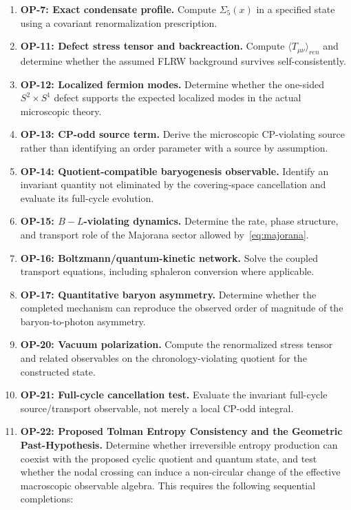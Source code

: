 \documentclass[11pt]{article}
\theoremstyle{canonmath}
\theoremstyle{canonpostulate}
\theoremstyle{canonclaim}
\def\mathrm#1{#1}%
\begin{document}
\begin{enumerate}
\item \textbf{OP-7: Exact condensate profile.} Compute $\Sigma_5(x)$ in a specified state using a covariant renormalization prescription.
\item \textbf{OP-11: Defect stress tensor and backreaction.} Compute $\langle T_{\mu\nu}\rangle_{\mathrm{ren}}$ and determine whether the assumed FLRW background survives self-consistently.
\item \textbf{OP-12: Localized fermion modes.} Determine whether the one-sided $S^2\times S^1$ defect supports the expected localized modes in the actual microscopic theory.
\item \textbf{OP-13: CP-odd source term.} Derive the microscopic CP-violating source rather than identifying an order parameter with a source by assumption.
\item \textbf{OP-14: Quotient-compatible baryogenesis observable.} Identify an invariant quantity not eliminated by the covering-space cancellation and evaluate its full-cycle evolution.
\item \textbf{OP-15: $B-L$-violating dynamics.} Determine the rate, phase structure, and transport role of the Majorana sector allowed by~\eqref{eq:majorana}.
\item \textbf{OP-16: Boltzmann/quantum-kinetic network.} Solve the coupled transport equations, including sphaleron conversion where applicable.
\item \textbf{OP-17: Quantitative baryon asymmetry.} Determine whether the completed mechanism can reproduce the observed order of magnitude of the baryon-to-photon asymmetry.
\item \textbf{OP-20: Vacuum polarization.} Compute the renormalized stress tensor and related observables on the chronology-violating quotient for the constructed state.
\item \textbf{OP-21: Full-cycle cancellation test.} Evaluate the invariant full-cycle source/transport observable, not merely a local CP-odd integral.
\item \textbf{OP-22: Proposed Tolman Entropy Consistency and the Geometric Past-Hypothesis.} Determine whether irreversible entropy production can coexist with the proposed cyclic quotient and quantum state, and test whether the nodal crossing can induce a non-circular change of the effective macroscopic observable algebra. This requires the following sequential completions:
\begin{enumerate}[label=\textbf{OP-22\alph*.}, leftmargin=*, itemsep=0.1em]

\end{enumerate}
\end{enumerate}
\end{document}
